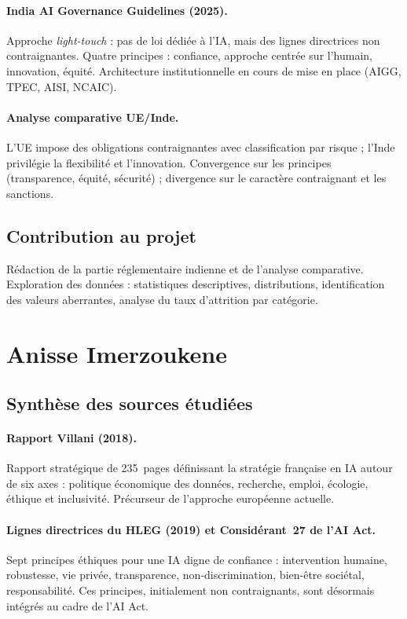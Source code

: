 \documentclass[12pt,a4paper]{article}
\begin{document}
\paragraph{India AI Governance Guidelines (2025).}
Approche \textit{light-touch} : pas de loi dédiée à l'IA, mais des lignes directrices non contraignantes. Quatre principes : confiance, approche centrée sur l'humain, innovation, équité. Architecture institutionnelle en cours de mise en place (AIGG, TPEC, AISI, NCAIC).

\paragraph{Analyse comparative UE/Inde.}
L'UE impose des obligations contraignantes avec classification par risque ; l'Inde privilégie la flexibilité et l'innovation. Convergence sur les principes (transparence, équité, sécurité) ; divergence sur le caractère contraignant et les sanctions.

\subsection{Contribution au projet}

Rédaction de la partie réglementaire indienne et de l'analyse comparative. Exploration des données : statistiques descriptives, distributions, identification des valeurs aberrantes, analyse du taux d'attrition par catégorie.

\section{Anisse Imerzoukene}

\subsection{Synthèse des sources étudiées}

\paragraph{Rapport Villani (2018).}
Rapport stratégique de 235~pages définissant la stratégie française en IA autour de six axes : politique économique des données, recherche, emploi, écologie, éthique et inclusivité. Précurseur de l'approche européenne actuelle.

\paragraph{Lignes directrices du HLEG (2019) et Considérant~27 de l'AI Act.}
Sept principes éthiques pour une IA digne de confiance : intervention humaine, robustesse, vie privée, transparence, non-discrimination, bien-être sociétal, responsabilité. Ces principes, initialement non contraignants, sont désormais intégrés au cadre de l'AI Act.
\end{document}
